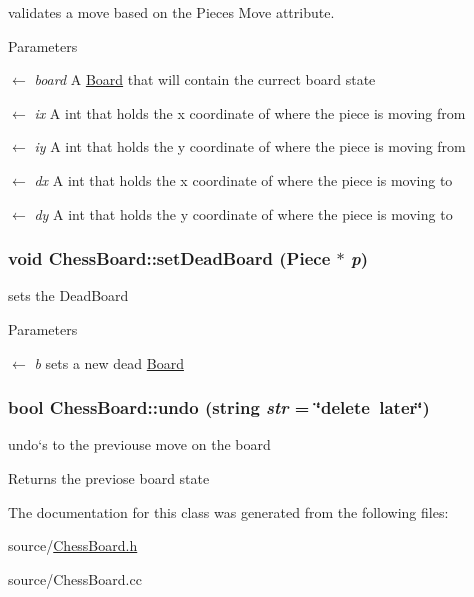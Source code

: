 validates a move based on the Pieces Move attribute. 
\begin{DoxyParams}{Parameters}
\item[\mbox{$\leftarrow$} {\em board}]A \hyperlink{classBoard}{Board} that will contain the currect board state \item[\mbox{$\leftarrow$} {\em ix}]A int that holds the x coordinate of where the piece is moving from \item[\mbox{$\leftarrow$} {\em iy}]A int that holds the y coordinate of where the piece is moving from \item[\mbox{$\leftarrow$} {\em dx}]A int that holds the x coordinate of where the piece is moving to \item[\mbox{$\leftarrow$} {\em dy}]A int that holds the y coordinate of where the piece is moving to \end{DoxyParams}
\hypertarget{classChessBoard_a3d378451fd54b5f335d32143a413afaf}{
\subsubsection[{setDeadBoard}]{\setlength{\rightskip}{0pt plus 5cm}void ChessBoard::setDeadBoard ({\bf Piece} $\ast$ {\em p})}}
\label{classChessBoard_a3d378451fd54b5f335d32143a413afaf}


sets the DeadBoard 
\begin{DoxyParams}{Parameters}
\item[\mbox{$\leftarrow$} {\em b}]sets a new dead \hyperlink{classBoard}{Board} \end{DoxyParams}
\hypertarget{classChessBoard_a88cc4b18d8ff152040bbf19f3938f263}{
\subsubsection[{undo}]{\setlength{\rightskip}{0pt plus 5cm}bool ChessBoard::undo (string {\em str} = {\ttfamily \char`\"{}delete~later\char`\"{}})}}
\label{classChessBoard_a88cc4b18d8ff152040bbf19f3938f263}


undo`s to the previouse move on the board \begin{DoxyReturn}{Returns}
the previose board state 
\end{DoxyReturn}


The documentation for this class was generated from the following files:\begin{DoxyCompactItemize}
\item 
source/\hyperlink{ChessBoard_8h}{ChessBoard.h}\item 
source/ChessBoard.cc\end{DoxyCompactItemize}
